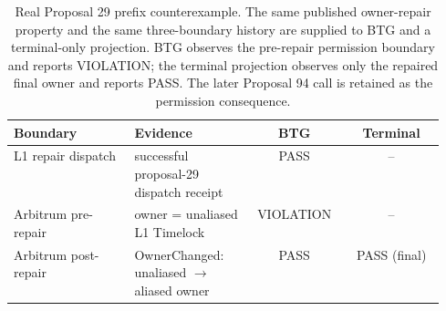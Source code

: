 \begin{table}[t]\centering\scriptsize
\caption{Real Proposal 29 prefix counterexample. The same published owner-repair property and the same three-boundary history are supplied to BTG and a terminal-only projection. BTG observes the pre-repair permission boundary and reports VIOLATION; the terminal projection observes only the repaired final owner and reports PASS. The later Proposal 94 call is retained as the permission consequence.}
\label{tab:proposal29-terminal-prefix}
\begin{tabular}{@{}p{0.28\linewidth}p{0.27\linewidth}cc@{}}\toprule
Boundary & Evidence & BTG & Terminal \\\midrule
L1 repair dispatch & successful proposal-29 dispatch receipt & PASS & -- \\
Arbitrum pre-repair & owner = unaliased L1 Timelock & VIOLATION & -- \\
Arbitrum post-repair & OwnerChanged: unaliased $\rightarrow$ aliased owner & PASS & PASS (final) \\
\bottomrule\end{tabular}
\end{table}
